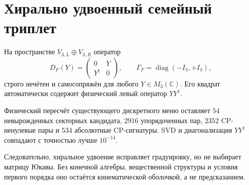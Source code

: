 \section*{Хирально удвоенный семейный триплет}

На пространстве \(V_{3,L}\oplus V_{3,R}\) оператор
\[
 D_F(Y)=
 \begin{pmatrix}
 0&Y\\
 Y^\dagger&0
 \end{pmatrix},
 \qquad
 \Gamma_F=\operatorname{diag}(-I_3,+I_3),
\]
строго нечётен и самосопряжён для любого \(Y\in M_3(\mathbb C)\). Его
квадрат автоматически содержит физический левый оператор \(YY^\dagger\).

Физический пересчёт существующего дискретного меню оставляет \(54\)
невырожденных секторных кандидата, \(2916\) упорядоченных пар, \(2352\)
CP-ненулевые пары и \(534\) абсолютные CP-сигнатуры. SVD и
диагонализация \(YY^\dagger\) совпадают с точностью лучше \(10^{-14}\).

Следовательно, хиральное удвоение исправляет градуировку, но не выбирает
матрицу Юкавы. Без конечной алгебры, вещественной структуры и условия
первого порядка оно остаётся кинематической оболочкой, а не предсказанием.